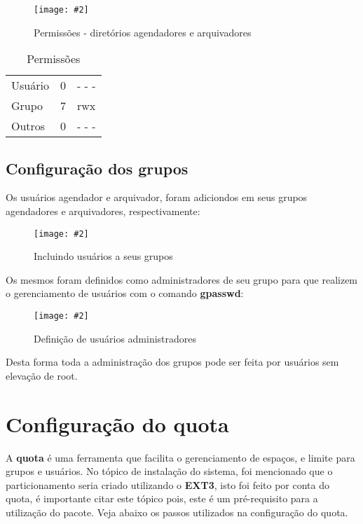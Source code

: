 \documentclass[
	12pt,				%
	openany,			%
	a4paper,			%
	chapter=TITLE,		%
	section=TITLE,		%
	english,
	brazil				%
]{abntex2}
\newcommand{\includeImage}[3] {

\begin{figure}[H]
 	 \centering
  		\texttt{[image: \#2]}
  	\caption{#3}
\end{figure}

}
\begin{document}
\includeImage{0.7}{imgs/5_gerenciamento_grupos/permissao_restringida_apenas_para_os_grupos.png}{Permissões - diretórios agendadores e arquivadores}

\begin{table}[h]
\caption{Permissões}
\centering
\begin{tabular}{r|lr}
\cline{1-3}
\multicolumn{1}{|l|}{Usuário} & \multicolumn{1}{l|}{0} & \multicolumn{1}{l|}{- - -} \\ 
\cline{1-3}
\multicolumn{1}{|l|}{Grupo} & \multicolumn{1}{l|}{7} & \multicolumn{1}{l|}{rwx} \\ 
\cline{1-3}
\multicolumn{1}{|l|}{Outros} & \multicolumn{1}{l|}{0} & \multicolumn{1}{l|}{- - -} \\ 
\cline{1-3}
\end{tabular}
\end{table}

\subsection{Configuração dos grupos}

Os usuários agendador e arquivador, foram adiciondos em seus grupos agendadores e arquivadores, respectivamente:

\includeImage{0.7}{imgs/5_gerenciamento_grupos/adicionando_usuarios_aos_grupos.png}{Incluindo usuários a seus grupos}

Os mesmos foram definidos como administradores de seu grupo para que realizem o gerenciamento de usuários com o comando \textbf{gpasswd}:

\includeImage{0.7}{imgs/5_gerenciamento_grupos/definindo_administrador_dos_grupos.png}{Definição de usuários administradores}

Desta forma toda a administração dos grupos pode ser feita por usuários sem elevação de root.

\section{Configuração do quota}

A \textbf{quota} é uma ferramenta que facilita o gerenciamento de espaços, e limite para grupos e usuários. No tópico de instalação do sistema, foi mencionado que o particionamento seria criado utilizando o \textbf{EXT3}, isto foi feito por conta do quota, é importante citar este tópico pois, este é um pré-requisito para a utilização do pacote. Veja abaixo os passos utilizados na configuração do quota. 
\end{document}
